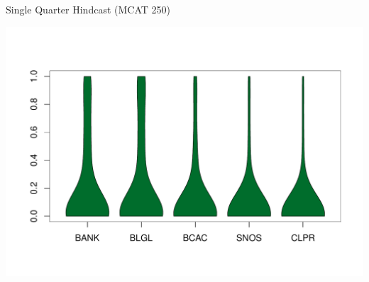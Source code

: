 \documentclass[ xcolor = pdftex, dvipsnames, table ]{beamer}
\begin{document}
\begin{frame}{Single Quarter Hindcast (MCAT 250)}
\begin{minipage}{0.29\textwidth}
\includegraphics[height=0.36\textheight]{../pictures/vioOSDTWL.pdf}
\end{minipage}
\end{frame}

%
%
\end{document}
